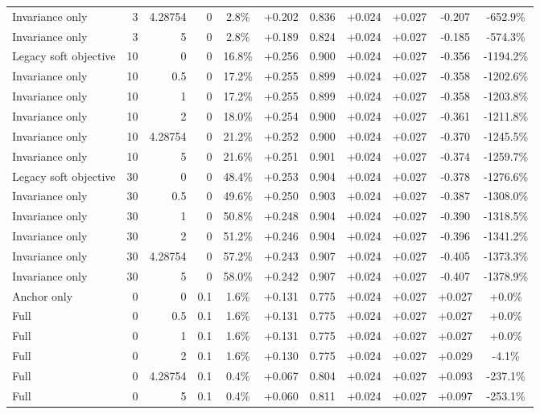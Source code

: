 \begin{table}[htbp]
\begin{tabular}{lrrrccccccc}
Invariance only & 3 & 4.28754 & 0 & 2.8\% & +0.202 & 0.836 & +0.024 & +0.027 & -0.207 & -652.9\% \\
Invariance only & 3 & 5 & 0 & 2.8\% & +0.189 & 0.824 & +0.024 & +0.027 & -0.185 & -574.3\% \\
Legacy soft objective & 10 & 0 & 0 & 16.8\% & +0.256 & 0.900 & +0.024 & +0.027 & -0.356 & -1194.2\% \\
Invariance only & 10 & 0.5 & 0 & 17.2\% & +0.255 & 0.899 & +0.024 & +0.027 & -0.358 & -1202.6\% \\
Invariance only & 10 & 1 & 0 & 17.2\% & +0.255 & 0.899 & +0.024 & +0.027 & -0.358 & -1203.8\% \\
Invariance only & 10 & 2 & 0 & 18.0\% & +0.254 & 0.900 & +0.024 & +0.027 & -0.361 & -1211.8\% \\
Invariance only & 10 & 4.28754 & 0 & 21.2\% & +0.252 & 0.900 & +0.024 & +0.027 & -0.370 & -1245.5\% \\
Invariance only & 10 & 5 & 0 & 21.6\% & +0.251 & 0.901 & +0.024 & +0.027 & -0.374 & -1259.7\% \\
Legacy soft objective & 30 & 0 & 0 & 48.4\% & +0.253 & 0.904 & +0.024 & +0.027 & -0.378 & -1276.6\% \\
Invariance only & 30 & 0.5 & 0 & 49.6\% & +0.250 & 0.903 & +0.024 & +0.027 & -0.387 & -1308.0\% \\
Invariance only & 30 & 1 & 0 & 50.8\% & +0.248 & 0.904 & +0.024 & +0.027 & -0.390 & -1318.5\% \\
Invariance only & 30 & 2 & 0 & 51.2\% & +0.246 & 0.904 & +0.024 & +0.027 & -0.396 & -1341.2\% \\
Invariance only & 30 & 4.28754 & 0 & 57.2\% & +0.243 & 0.907 & +0.024 & +0.027 & -0.405 & -1373.3\% \\
Invariance only & 30 & 5 & 0 & 58.0\% & +0.242 & 0.907 & +0.024 & +0.027 & -0.407 & -1378.9\% \\
Anchor only & 0 & 0 & 0.1 & 1.6\% & +0.131 & 0.775 & +0.024 & +0.027 & +0.027 & +0.0\% \\
Full & 0 & 0.5 & 0.1 & 1.6\% & +0.131 & 0.775 & +0.024 & +0.027 & +0.027 & +0.0\% \\
Full & 0 & 1 & 0.1 & 1.6\% & +0.131 & 0.775 & +0.024 & +0.027 & +0.027 & +0.0\% \\
Full & 0 & 2 & 0.1 & 1.6\% & +0.130 & 0.775 & +0.024 & +0.027 & +0.029 & -4.1\% \\
Full & 0 & 4.28754 & 0.1 & 0.4\% & +0.067 & 0.804 & +0.024 & +0.027 & +0.093 & -237.1\% \\
Full & 0 & 5 & 0.1 & 0.4\% & +0.060 & 0.811 & +0.024 & +0.027 & +0.097 & -253.1\% \\

\end{tabular}
\end{table}
